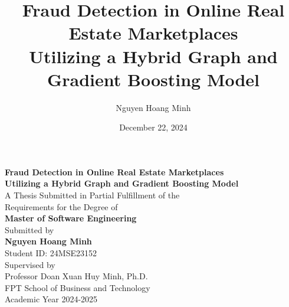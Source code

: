 \documentclass[11pt,a4paper]{report}
\title{Fraud Detection in Online Real Estate Marketplaces\\Utilizing a Hybrid Graph and Gradient Boosting Model}
\author{Nguyen Hoang Minh}
\date{December 22, 2024}
\newcommand{\studentid}{24MSE23152}
\newcommand{\degreeprogram}{Master of Software Engineering}
\newcommand{\supervisor}{Professor Doan Xuan Huy Minh, Ph.D.}
\newcommand{\institution}{FPT School of Business and Technology}
\newcommand{\academicyear}{2024-2025}
\begin{document}
\begin{titlepage}
\centering
\vspace*{1.5cm}

{\fontsize{18}{22}\bfseries Fraud Detection in Online Real Estate Marketplaces}\\[0.4cm]
{\fontsize{18}{22}\bfseries Utilizing a Hybrid Graph and Gradient Boosting Model}\\[1.5cm]

{\fontsize{12}{14} A Thesis Submitted in Partial Fulfillment of the\\Requirements for the Degree of}\\[0.4cm]
{\fontsize{14}{18}\bfseries \degreeprogram}\\[1.2cm]

{\fontsize{12}{14} Submitted by}\\[0.3cm]
{\fontsize{14}{18}\bfseries Nguyen Hoang Minh}\\[0.2cm]
{\fontsize{11}{13.2} Student ID: \studentid}\\[1.2cm]

{\fontsize{12}{14} Supervised by}\\[0.3cm]
{\fontsize{13}{17} \supervisor}\\[1.2cm]

{\fontsize{12}{14} \institution}\\[0.2cm]
{\fontsize{12}{14} Academic Year \academicyear}\\[1cm]

\vfill

\end{titlepage}

\newpage
\end{document}

